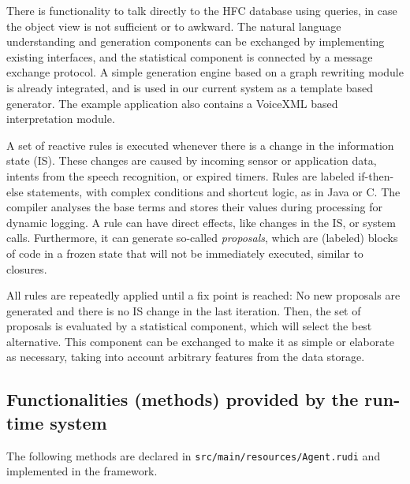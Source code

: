 There is functionality to talk directly to the HFC database using queries, in
case the object view is not sufficient or to awkward. The natural language
understanding and generation components can be exchanged by implementing existing
interfaces, and the statistical component is connected by a message exchange
protocol. A simple generation engine based on a graph rewriting module is
already integrated, and is used in our current system as a template based
generator. The example application also contains a VoiceXML based
interpretation module.

A set of reactive rules is executed whenever there is a change in the
information state (IS). These changes are caused by incoming sensor or
application data, intents from the speech recognition, or expired timers.
Rules are labeled if-then-else statements, with complex conditions and shortcut
logic, as in Java or C. The compiler analyses the base terms and stores their
values during processing for dynamic logging. A rule can have direct effects,
like changes in the IS, or system calls. Furthermore, it can generate so-called
\emph{proposals}, which are (labeled) blocks of code in a frozen state that
will not be immediately executed, similar to closures.

All rules are repeatedly applied until a fix point is reached: No new proposals
are generated and there is no IS change in the last iteration. Then, the set of
proposals is evaluated by a statistical component, which will select the best
alternative. This component can be exchanged to make it as simple or elaborate
as necessary, taking into account arbitrary features from the data storage.

\subsection{Functionalities (methods) provided by the run-time system}
The following methods are declared in \texttt{src/main/resources/Agent.rudi} and implemented in the \vonda framework.


